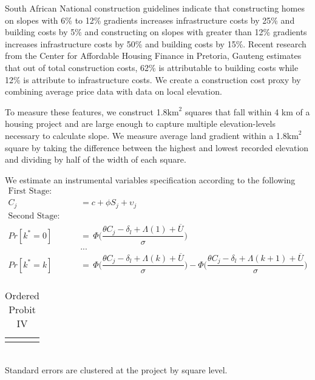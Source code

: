 \documentclass[12pt]{article}
\begin{document}
South African National construction guidelines indicate that constructing homes on slopes with 6\% to 12\% gradients increases infrastructure costs by 25\% and building costs by 5\% and constructing on slopes with greater than 12\% gradients increases infrastructure costs by 50\% and building costs by 15\%.  Recent research from the Center for Affordable Housing Finance in Pretoria, Gauteng estimates that out of total construction costs, 62\% is attributable to building costs while 12\% is attribute to infrastructure costs.  We create a construction cost proxy by combining average price data with data on local elevation.

To measure these features, we construct 1.8$\text{km}^{2}$ squares that fall within 4 km of a housing project and are large enough to capture multiple elevation-levels necessary to calculate slope.  We measure average land gradient within a 1.8$\text{km}^{2}$ square by taking the difference between the highest and lowest recorded elevation and dividing by half of the width of each square.  


We estimate an instrumental variables specification according to the following 
\begin{align*}
\text{First Stage: Linear Regression} & \\
C_{j} &= c + \phi S_j + \upsilon_j \\ 
\text{Second Stage: Ordered Probit} & \\
Pr[ k^{*} =0 ] \, &= \, \Phi\Bigg(\dfrac{\theta C_{j} - \delta_{l} + \Lambda(1) + \overline{U}}{\sigma}\Bigg) \\
&... \\
Pr[ k^{*} =k ] \, &= \, \Phi\Bigg(\dfrac{\theta C_{j} - \delta_{l} + \Lambda(k) + \overline{U}}{\sigma}\Bigg) - \Phi\Bigg(\dfrac{\theta C_{j} - \delta_{l} + \Lambda(k+1) + \overline{U}}{\sigma}\Bigg) \\
\end{align*}



\begin{table}[h]
\centering
\caption{Ordered Probit IV}\label{table:ivreg_output}
\vspace{-2mm}
\begin{tabular}{lD}
\toprule



% 
% 
\bottomrule\\[-.6em]
\end{tabular}\\
Standard errors are clustered at the project by square level.  
\end{table}
\end{document}
